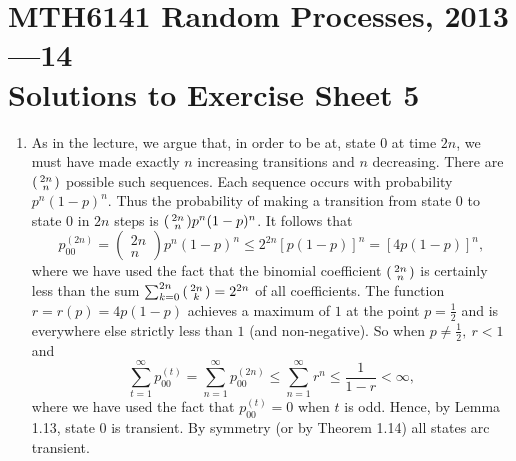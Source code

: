 \documentclass[11pt,a4paper]{article}
\newenvironment{psmallmatrix}
  {\left(\begin{smallmatrix}}
  {\end{smallmatrix}\right)}
\begin{document}
    \section*{MTH6141 Random Processes, 2013—14\\Solutions to Exercise Sheet 5}
    \begin{enumerate}
        \item As in the lecture, we argue that, in order to be at, state $0$ at time $2n$, we must have made exactly $n$ increasing transitions and $n$ decreasing. There are
        $
        \begin{psmallmatrix}
            2n \\
            n
        \end{psmallmatrix}
        $
        possible such sequences. Each sequence occurs with probability $p^n(1-p)^n$. Thus the probability of making a transition from state 0 to state 0 in $2n$ steps is
        $
        \begin{psmallmatrix}
            2n\\
            n
        \end{psmallmatrix}
        p^n(1-p)^n
        $.
        It follows that
        $$
        p_{00}^{(2n)}
        =
        \begin{pmatrix}
            2n\\
            n
        \end{pmatrix}
        p^n(1-p)^n \leq 2^{2n}[p(1-p)]^n
        =
        [4p(1-p)]^n,
        $$
        where we have used the fact that the binomial coefficient 
        $
        \begin{psmallmatrix}
            2n\\
            n
        \end{psmallmatrix}
        $
        is certainly less than the sum 
        $
        \sum_{k=0}^{2n}
        \begin{psmallmatrix}
            2n\\
            k
        \end{psmallmatrix}
        =
        2^{2n}
        $
        of all coefficients. The function $r = r(p) = 4p(1-p)$ achieves a maximum of $1$ at the point $p = \frac{1}{2}$ and is everywhere else strictly less than $1$ (and non-negative). So when $p \neq \frac{1}{2},\ r<1$ and
        $$
        \sum_{t=1}^\infty p_{00}^{(t)} = \sum_{n=1}^\infty p_{00}^{(2n)} \leq \sum_{n=1}^\infty r^n \leq \frac{1}{1-r} < \infty,
        $$
        where we have used the fact that $p_{00}^{(t)} = 0$ when $t$ is odd. Hence, by Lemma 1.13, state 0 is transient. By symmetry (or by Theorem 1.14) all states arc transient.

\end{enumerate}
\end{document}
